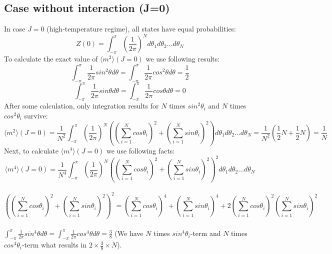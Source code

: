 \subsection{Case without interaction (J=0)}

In case $J=0$ (high-temperature regime), all states have equal probabilities:
\begin{equation}
\label{paritionfunction_free_zero}
Z(0) =  %
\int_{-\pi}^{\pi} (\frac{1}{2 \pi})^N   d \theta_1 d \theta_2 \dots d\theta_N 
\end{equation}
To calculate the exact value of $\langle m^2 \rangle (J=0)$  we use following results: 
\begin{equation*} 
 \int_{-\pi}^{\pi}  \frac{1}{2 \pi} sin^2 \theta d \theta =\int_{-\pi}^{\pi}  \frac{1}{2 \pi} cos^2 \theta d \theta = \frac{1}{2} 
\end{equation*}
 \begin{equation*} \int_{-\pi}^{\pi}  \frac{1}{2 \pi} sin \theta d \theta  =\int_{-\pi}^{\pi}  \frac{1}{2 \pi} cos  \theta d \theta = 0 \end{equation*}
   After some calculation, only integration results for $N$ times $sin^2 \theta_i$ and $N$ times $cos^2 \theta_i$ survive:
\begin{equation} 
\label{m2j0}
  \langle m^2 \rangle (J=0) = \frac{1}{N^2}   \int_{-\pi}^{\pi}  (\frac{1}{2 \pi})^N \left(  
   ( \sum_{i=1}^{N} cos \theta_i )^2 +  (\sum_{i=1}^{N} sin \theta_i  )^2 \right)  d \theta_1 d \theta_2 \dots d\theta_N =
  \frac{1}{N^2}  (\frac{1}{2}N +\frac{1}{2}N)   = \frac{1}{N}
\end{equation}
Next, to calculate $\langle m^4 \rangle (J=0)$ we use following facts: 
\begin{equation*}
\langle m^4 \rangle (J=0) = \frac{1}{N^4}   \int_{-\pi}^{\pi}  (\frac{1}{2 \pi})^N \left(  
( \sum_{i=1}^{N} cos \theta_i )^2 +  (\sum_{i=1}^{N} sin \theta_i  )^2 \right)^2 d \theta_1 d \theta_2 \dots d\theta_N  
\end{equation*} \\ 
\begin{equation*}
 \left(  
( \sum_{i=1}^{N} cos \theta_i )^2 +  (\sum_{i=1}^{N} sin \theta_i  )^2 \right)^2 =  (\sum_{i=1}^{N} cos \theta_i )^4 + (\sum_{i=1}^{N} sin \theta_i )^4 + 2 ( \sum_{i=1}^{N} cos \theta_i )^2( \sum_{i=1}^{N} sin \theta_i )^2 
\end{equation*} \\

$ \int_{-\pi}^{\pi}  \frac{1}{2 \pi} sin^4 \theta d \theta =\int_{-\pi}^{\pi}  \frac{1}{2 \pi} cos^4 \theta d \theta = \frac{3}{8}$ (We  have $N$ times $sin^4\theta_i$-term and $N$ times $cos^4\theta_i$-term  what results in $2\times \frac{3}{8} \times N$). \\

